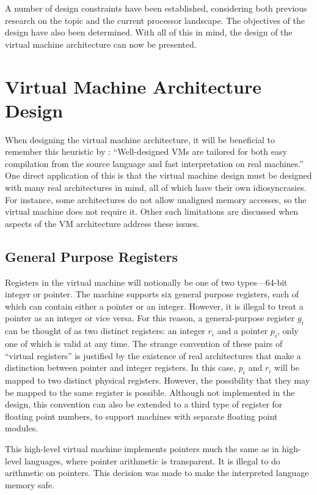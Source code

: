 	A number of design constraints have been established, considering both previous research on the topic and the current processor landscape. The objectives of the design have also been determined. With all of this in mind, the design of the virtual machine architecture can now be presented.
	
	\section{Virtual Machine Architecture Design}
		When designing the virtual machine architecture, it will be beneficial to remember this heuristic by \cite{structureinterpreters}: ``Well-designed VMs are tailored for both easy compilation from the source language and fast interpretation on real machines.'' One direct application of this is that the virtual machine design must be designed with many real architectures in mind, all of which have their own idiosyncrasies. For instance, some architectures do not allow unaligned memory accesses, so the virtual machine does not require it. Other such limitations are discussed when aspects of the VM architecture address these issues.
		
		\subsection{General Purpose Registers}
		Registers in the virtual machine will notionally be one of two types---64-bit integer or pointer. The machine supports six general purpose registers, each of which can contain either a pointer or an integer. However, it is illegal to treat a pointer as an integer or vice versa. For this reason, a general-purpose register $g_i$ can be thought of as two distinct registers: an integer $r_i$ and a pointer $p_i$, only one of which is valid at any time. The strange convention of these pairs of ``virtual registers'' is justified by the existence of real architectures that make a distinction between pointer and integer registers. In this case, $p_i$ and $r_i$ will be mapped to two distinct physical registers. However, the possibility that they may be mapped to the same register is possible. Although not implemented in the design, this convention can also be extended to a third type of register for floating point numbers, to support machines with separate floating point modules.
		
		This high-level virtual machine implements pointers much the same as in high-level languages, where pointer arithmetic is transparent. It is illegal to do arithmetic on pointers. This decision was made to make the interpreted language memory safe.
		
